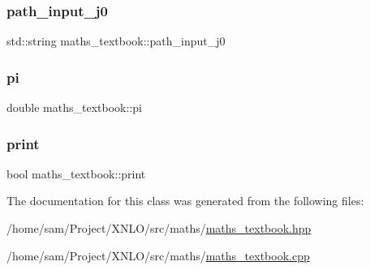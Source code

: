 \mbox{\label{classmaths__textbook_a5c8a254bd117beaba43916c38f8f6a66}} 
\subsubsection{\texorpdfstring{path\_input\_j0}{path\_input\_j0}}
{\footnotesize\ttfamily std\+::string maths\+\_\+textbook\+::path\+\_\+input\+\_\+j0\hspace{0.3cm}{\ttfamily [private]}}

\mbox{\label{classmaths__textbook_a96b811ef2a81ca51b98cf2a10c8ac5bc}} 
\subsubsection{\texorpdfstring{pi}{pi}}
{\footnotesize\ttfamily double maths\+\_\+textbook\+::pi}

\mbox{\label{classmaths__textbook_ae2a8fbebf9b44587f2d21df219c10812}} 
\subsubsection{\texorpdfstring{print}{print}}
{\footnotesize\ttfamily bool maths\+\_\+textbook\+::print}



The documentation for this class was generated from the following files\+:\begin{DoxyCompactItemize}
\item 
/home/sam/\+Project/\+X\+N\+L\+O/src/maths/\mbox{\hyperlink{maths__textbook_8hpp}{maths\+\_\+textbook.\+hpp}}\item 
/home/sam/\+Project/\+X\+N\+L\+O/src/maths/\mbox{\hyperlink{maths__textbook_8cpp}{maths\+\_\+textbook.\+cpp}}\end{DoxyCompactItemize}
